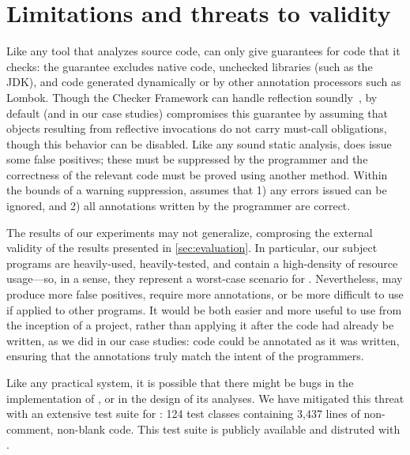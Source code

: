 \section{Limitations and threats to validity}
\label{sec:threats}

Like any tool that analyzes source code, \Tool can only
give guarantees for code that it checks: the guarantee
excludes native code, unchecked libraries (such as the JDK),
and code generated dynamically or by other annotation processors
such as Lombok. Though the Checker Framework can handle
reflection soundly~\cite{BarrosJMVDdAE2015}, by default (and in our case studies)
\Tool compromises this guarantee
by assuming that objects resulting from reflective invocations
do not carry must-call obligations, though this behavior can
be disabled. Like any sound static analysis, \Tool does
issue some false positives; these must be suppressed by
the programmer and the correctness of the relevant code
must be proved using another method. Within the bounds
of a warning suppression, \Tool assumes that 1)
any errors issued can be ignored, and 2) all annotations
written by the programmer are correct.

The results of our experiments may not generalize, comprosing the
external validity of the results presented in
\cref{sec:evaluation}. In particular, our subject programs are
heavily-used, heavily-tested, and contain a high-density of resource
usage---so, in a sense, they represent a worst-case scenario for
\Tool.  Nevertheless, \Tool may produce more false positives, require
more annotations, or be more difficult to use if applied to other
programs.  It would be both easier and more useful to use \Tool from
the inception of a project, rather than applying it after the code had
already be written, as we did in our case studies: code could be
annotated as it was written, ensuring that the annotations truly match
the intent of the programmers.

Like any practical system, it is possible that there might
be bugs in the implementation of \Tool, or in the design of
its analyses. We have mitigated this threat with an extensive
test suite for \Tool:
124 test classes containing
3,437 lines of non-comment, non-blank code.
This test suite is publicly available and distruted with \Tool.
